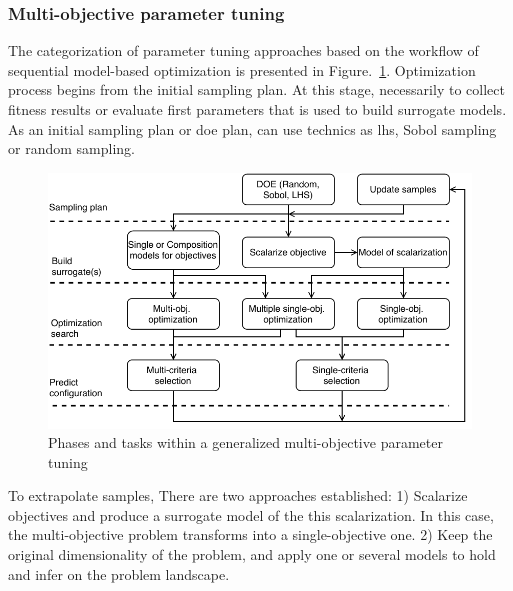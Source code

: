         
        \subsubsection{Multi-objective parameter tuning}

            The categorization of parameter tuning approaches based on the workflow of sequential model-based optimization is presented in Figure.~\ref{fig:mo_param_tuning}. Optimization process begins from the initial sampling plan. At this stage, necessarily to collect fitness results or evaluate first parameters that is used to build surrogate models. As an initial sampling plan or \gls{doe} plan, can use technics as \gls{lhs}, Sobol sampling or random sampling.
            
            \begin{figure} 
                \centering
                \includegraphics[width=\textwidth]{content/images/tax_mb_tuning}
                \caption[Phases and tasks within a generalized multi-objective parameter tuning]{Phases and tasks within a generalized multi-objective parameter tuning}
                \label{fig:mo_param_tuning}
            \end{figure}

            To extrapolate samples, There are two approaches established: 1) Scalarize objectives and produce a surrogate model of the this scalarization. In this case, the multi-objective problem transforms into a single-objective one. 2) Keep the original dimensionality of the problem, and apply one or several models to hold and infer on the problem landscape.

